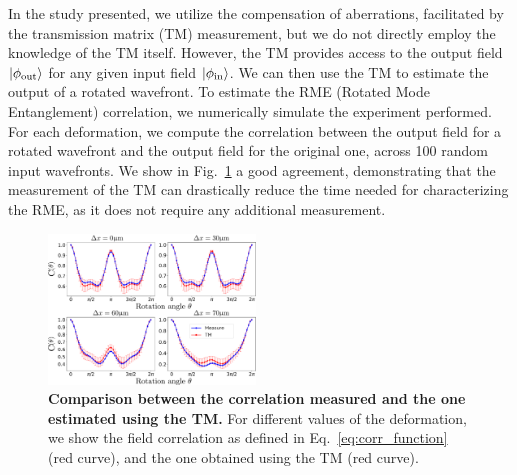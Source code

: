 \documentclass[aps,prl,twocolumn, amsmath,amssymb,superscriptaddress]{revtex4-2}
\DeclarePairedDelimiter\ket{\lvert}{\rangle}
\begin{document}
In the study presented,
we utilize the compensation of aberrations, facilitated by the transmission matrix (TM) measurement,
but we do not directly employ the knowledge of the TM itself.
However, the TM provides access to the output field $\ket{\phi_{\text{out}}}$
for any given input field $\ket{\phi_{\text{in}}}$.
We can then use the TM to estimate the output of a rotated wavefront.
To estimate the RME (Rotated Mode Entanglement) correlation, we numerically simulate the experiment performed.
For each deformation, we compute the correlation between the output field for a rotated wavefront and the output field for the original one, across 100 random input wavefronts.
We show in Fig.~\ref{fig:TMvsCE} a good agreement,
demonstrating that the measurement of the TM can drastically reduce
the time needed for characterizing the RME, 
as it does not require any additional measurement.

\begin{figure}[ht]
\includegraphics[width=0.49\textwidth]{images/Fig_A2.pdf}
\caption{
    \textbf{Comparison between the correlation measured and the one estimated using the TM.}
    For different values of the deformation, 
    we show the field correlation as defined in Eq.~\ref{eq:corr_function} (red curve), 
    and the one obtained using the TM (red curve).
}
\label{fig:TMvsCE}
\end{figure}




\end{document}
